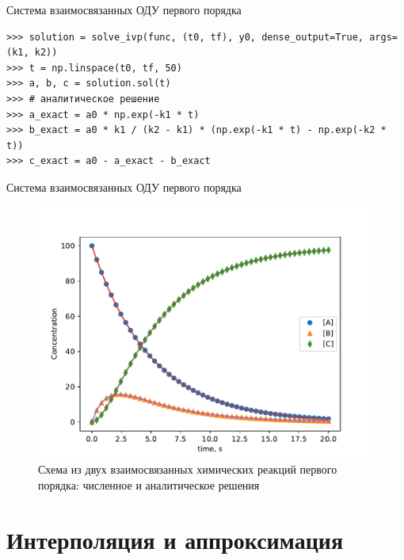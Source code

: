 \documentclass[aspectratio=169, mathserif]{beamer}	%
\begin{document}
\begin{frame}[fragile, label=c]{Система взаимосвязанных ОДУ первого порядка}
\scriptsize
\begin{verbatim}
>>> solution = solve_ivp(func, (t0, tf), y0, dense_output=True, args=(k1, k2))
>>> t = np.linspace(t0, tf, 50)
>>> a, b, c = solution.sol(t)
>>> # аналитическое решение
>>> a_exact = a0 * np.exp(-k1 * t)
>>> b_exact = a0 * k1 / (k2 - k1) * (np.exp(-k1 * t) - np.exp(-k2 * t))
>>> c_exact = a0 - a_exact - b_exact
\end{verbatim}
\vfill
\end{frame}

\begin{frame}[fragile, label=c]{Система взаимосвязанных ОДУ первого порядка}
\scriptsize
\begin{figure}[h!]
	\centering
	\includegraphics[width=.65\linewidth]{./pics/Figure_36}
	\caption{Схема из двух взаимосвязанных химических реакций первого порядка: численное и аналитическое решения}
\end{figure}
\vfill
\end{frame}

\section{Интерполяция и аппроксимация}
\sectionframe
\end{document}
